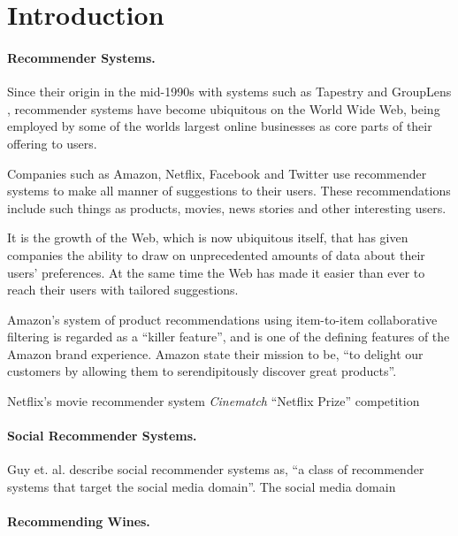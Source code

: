 \iffalse 
Chapter 1: Introduction - the topic, the background, why the topic is relevant or of interest to you, what you hoped to achieve, the aims and objectives of the project.  
\fi

\section{Introduction}

\paragraph{Recommender Systems.}

Since their origin in the mid-1990s with systems such as Tapestry \cite{Goldberg92} and GroupLens \cite{Resnick94}, recommender systems have become ubiquitous on the World Wide Web, being employed by some of the worlds largest online businesses as core parts of their offering to users.

Companies such as Amazon, Netflix, Facebook and Twitter use recommender systems to make all manner of suggestions to their users. These recommendations include such things as products, movies, news stories and other interesting users. 

It is the growth of the Web, which is now ubiquitous itself, that has given companies the ability to draw on unprecedented amounts of data about their users' preferences. At the same time the Web has made it easier than ever to reach their users with tailored suggestions.

Amazon's system of product recommendations using item-to-item collaborative filtering is regarded as a ``killer feature''\cite{Fortune12}, and is one of the defining features of the Amazon brand experience. Amazon state their mission to be, ``to delight our customers by allowing them to serendipitously discover great products''\cite{Fortune12}.

Netflix's movie recommender system \emph{Cinematch}  ``Netflix Prize'' competition 


\paragraph{Social Recommender Systems.}

Guy et. al. \cite{Guy11} describe social recommender systems as, ``a class of recommender systems that target the social media domain''. The social media domain 

\paragraph{Recommending Wines.}

